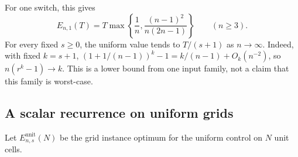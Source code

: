 For one switch, this gives
\begin{equation}\label{eq:uniform-one-switch}
 E_{n,1}(T)=T\max\left\{\frac1n,
 \frac{(n-1)^2}{n(2n-1)}\right\}\qquad(n\ge3).
\end{equation}
For every fixed $s\ge0$, the uniform value tends to $T/(s+1)$ as
$n\to\infty$. Indeed, with fixed $k=s+1$,
$(1+1/(n-1))^k-1=k/(n-1)+O_k(n^{-2})$, so
$n(r^k-1)\to k$. This is a lower bound from one input family, not a claim
that this family is worst-case.

\subsection{A scalar recurrence on uniform grids}

Let $E^{\mathrm{unit}}_{n,s}(N)$ be the grid instance optimum for the uniform
control on $N$ unit cells.

